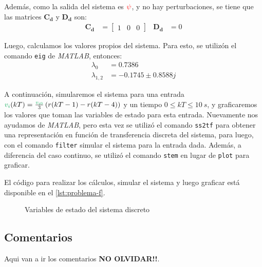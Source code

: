 Además, como la salida del sistema es $\mathbin{\color{red}\psi}$, y no hay perturbaciones,
se tiene que las matrices $\pmb{C_{d}}$ y $\pmb{D_{d}}$ son:
\begin{align}
  \pmb{C_{d}} &= \begin{bmatrix}
      1 & 0 & 0
  \end{bmatrix} &
  \pmb{D_{d}} &= 0
\end{align}

Luego, calculamos los valores propios del sistema. Para esto, se utilizón el
comando \verb|eig| de \textit{MATLAB}, entonces:
\begin{align}
  \lambda_{0} &=  0.7386 \\
  \lambda_{1,2} &=  -0.1745 \pm 0.8588j
\end{align}

A continuación, simularemos el sistema para una entrada
$\verd{v_{i}}(kT) = \frac{\verd{v_{i0}}}{3}\left(r(kT-1) - r(kT-4)\right)$
y un tiempo $0 \leq kT \leq 10\ \unit{s}$, y graficaremos los valores que
toman las variables de estado para esta entrada. Nuevamente nos ayudamos
de \textit{MATLAB}, pero esta vez se utilizó el comando \verb|ss2tf| para
obtener una representación en función de transferencia discreta del sistema,
para luego, con el comando \verb|filter| simular el sistema para la entrada
dada. Además, a diferencia del caso continuo, se utilizó el comando \verb|stem|
en lugar de \verb|plot| para graficar.

El código para realizar los cálculos, simular el sistema y luego graficar está
disponible en el \autoref{lst:problema-f}.

\begin{figure}[h]
  \centering
  
  \caption{Variables de estado del sistema discreto}\label{fig:estado-discreto}
\end{figure}

\FloatBarrier

\subsection{Comentarios}

Aqui van a ir los comentarios \textbf{NO OLVIDAR!!}.
